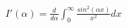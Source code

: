\documentclass[preview]{standalone}
\begin{document}
\begin{align*}
I'(\alpha) = \frac{d}{d\alpha}\int_{0}^{\infty}\frac{sin^2(\alpha x)}{x^2}dx
\end{align*}
\end{document}
